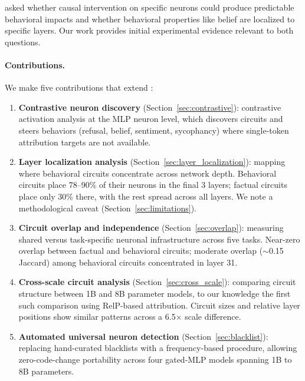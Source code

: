 \documentclass[11pt]{article}
\begin{document}
\citet{chalnick2025goodfire} asked whether causal intervention on specific neurons could produce predictable behavioral impacts and whether behavioral properties like belief are localized to specific layers. Our work provides initial experimental evidence relevant to both questions.

\paragraph{Contributions.}
We make five contributions that extend \citet{arora2025circuits}:

\begin{enumerate}[leftmargin=2em]
    \item \textbf{Contrastive neuron discovery} (Section~\ref{sec:contrastive}): contrastive activation analysis at the MLP neuron level, which discovers circuits and steers behaviors (refusal, belief, sentiment, sycophancy) where single-token attribution targets are not available.

    \item \textbf{Layer localization analysis} (Section~\ref{sec:layer_localization}): mapping where behavioral circuits concentrate across network depth. Behavioral circuits place 78--90\% of their neurons in the final 3 layers; factual circuits place only 30\% there, with the rest spread across all layers. We note a methodological caveat (Section~\ref{sec:limitations}).

    \item \textbf{Circuit overlap and independence} (Section~\ref{sec:overlap}): measuring shared versus task-specific neuronal infrastructure across five tasks. Near-zero overlap between factual and behavioral circuits; moderate overlap (${\sim}$0.15 Jaccard) among behavioral circuits concentrated in layer 31.

    \item \textbf{Cross-scale circuit analysis} (Section~\ref{sec:cross_scale}): comparing circuit structure between 1B and 8B parameter models, to our knowledge the first such comparison using RelP-based attribution. Circuit sizes and relative layer positions show similar patterns across a 6.5$\times$ scale difference.

    \item \textbf{Automated universal neuron detection} (Section~\ref{sec:blacklist}): replacing hand-curated blacklists with a frequency-based procedure, allowing zero-code-change portability across four gated-MLP models spanning 1B to 8B parameters.
\end{enumerate}
\end{document}
